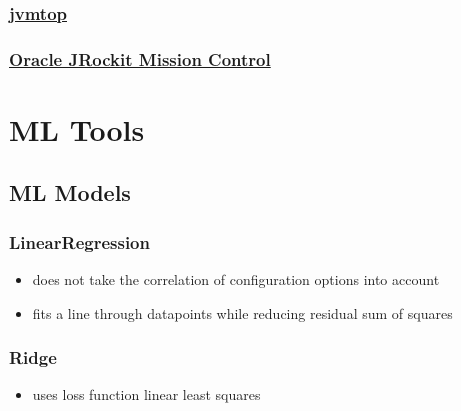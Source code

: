 \subsubsection{\href{https://github.com/patric-r/jvmtop}{jvmtop}}



\subsubsection{\href{http://www.oracle.com/technetwork/middleware/jrockit/overview/index-090630.html}{Oracle JRockit Mission Control}}



\section{ML Tools}

\subsection{ML Models}

\subsubsection{LinearRegression}
\begin{itemize}
	\item does not take the correlation of configuration options into account
	\item fits a line through datapoints while reducing residual sum of squares
\end{itemize}
\subsubsection{Ridge}
\begin{itemize}
	\item uses loss function linear least squares
\end{itemize}

